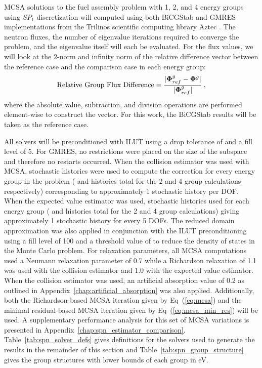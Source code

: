 MCSA solutions to the fuel assembly problem with 1, 2, and 4 energy
groups using $SP_1$ discretization will computed using both BiCGStab
and GMRES implementations from the Trilinos scientific computing
library Aztec \cite{heroux_overview_2005}. The neutron fluxes, the
number of eigenvalue iterations required to converge the problem, and
the eigenvalue itself will each be evaluated. For the flux values, we
will look at the 2-norm and infinity norm of the relative difference
vector between the reference case and the comparison case in each
energy group:
\begin{equation}
  \text{Relative Group Flux Difference} = \frac{|\mathbf{\Phi}_{ref}^g -
    \mathbf{\Phi}^g|}{|\mathbf{\Phi}_{ref}^g|}\:,
  \label{eq:relative_difference_vector}
\end{equation}
where the absolute value, subtraction, and division operations are
performed element-wise to construct the vector. For this work, the
BiCGStab results will be taken as the reference case.

All solvers will be preconditioned with ILUT using a drop tolerance of
 and a fill level of 5. For GMRES, no restrictions were
placed on the size of the subspace and therefore no restarts
occurred. When the collision estimator was used with MCSA, 
stochastic histories were used to compute the correction for every
energy group in the problem ( and  histories total
for the 2 and 4 group calculations respectively) corresponding to
approximately 1 stochastic history per DOF. When the expected value
estimator was used,  stochastic histories used for each
energy group ( and  histories total for the 2 and
4 group calculations) giving approximately 1 stochastic history for
every 5 DOFs. The reduced domain approximation was also applied in
conjunction with the ILUT preconditioning using a fill level of 100
and a threshold value of  to reduce the density of states
in the Monte Carlo problem. For relaxation parameters, all MCSA
computations used a Neumann relaxation parameter of 0.7 while a
Richardson relaxation of 1.1 was used with the collision estimator and
1.0 with the expected value estimator. When the collision estimator
was used, an artificial absorption value of 0.2 as outlined in
Appendix~\ref{chap:artificial_absorption} was also
applied. Additionally, both the Richardson-based MCSA iteration given
by Eq~(\ref{eq:mcsa}) and the minimal residual-based MCSA iteration
given by Eq~(\ref{eq:mcsa_min_res}) will be used. A supplementary
performance analysis for this set of MCSA variations is presented in
Appendix~\ref{chap:spn_estimator_comparison}. Table~\ref{tab:spn_solver_defs}
gives definitions for the solvers used to generate the results in the
remainder of this section and Table~\ref{tab:spn_group_structure}
gives the group structures with lower bounds of each group in eV.

